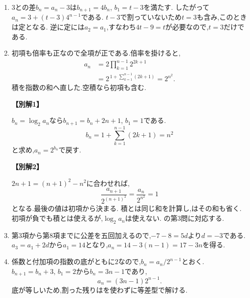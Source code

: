 \begin{enumerate}[label=\textbf{問\arabic*.},leftmargin=3.8em,format=\bookitemlink{practice-basic}{solution}{problem}]
          \item {}$3$との差$b_n=a_n-3$は$b_{n+1}=4b_n$, $b_1=t-3$を満たす.
                  したがって$a_n=3+(t-3)4^{n-1}$である.
                  $t-3$で割っていないため$t=3$も含み,このときは定となる.
                  逆に定には$a_2=a_1$,すなわち$4t-9=t$が必要なので,$t=3$だけである.

          \item 初項も倍率も正なので全項が正である.倍率を掛けると,
                  \[
                    \begin{aligned}
                    a_n&=2\prod_{k=1}^{n-1}2^{2k+1}\\
                       &=2^{\,1+\sum_{k=1}^{n-1}(2k+1)}=2^{n^2}.
                    \end{aligned}
                  \]
                  積を指数の和へ直した.空積なら初項も含む.
                  \par\smallskip\noindent\textbf{【別解1】}\par
                  $b_n=\log_2a_n$なら$b_{n+1}=b_n+2n+1$, $b_1=1$である.
                  \[
                    b_n=1+\sum_{k=1}^{n-1}(2k+1)=n^2
                  \]
                  と求め,$a_n=2^{b_n}$で戻す.
                  \par\smallskip\noindent\textbf{【別解2】}\par
                  $2n+1=(n+1)^2-n^2$に合わせれば,
                  \[
                    \frac{a_{n+1}}{2^{(n+1)^2}}=\frac{a_n}{2^{n^2}}=1
                  \]
                  となる.最後の値は初項から決まる.
                  積とは同じ和を計算し,はその和も省く.
                  初項が負でも積とは使えるが,$\log_2a_n$は使えない.
                  の第3問に対応する.

          \item 第3項から第8項までに公差を五回加えるので,$-7-8=5d$より$d=-3$である.
                  $a_3=a_1+2d$から$a_1=14$となり,$a_n=14-3(n-1)=17-3n$を得る.

          \item 係数と付加項の指数の底がともに$2$なので,$b_n=a_n/2^{n-1}$とおく.
                  $b_{n+1}=b_n+3$, $b_1=2$から$b_n=3n-1$であり,
                  \[
                    a_n=(3n-1)2^{n-1}.
                  \]
                  底が等しいため,割った残りはを使わずに等差型で解ける.


\end{enumerate}
